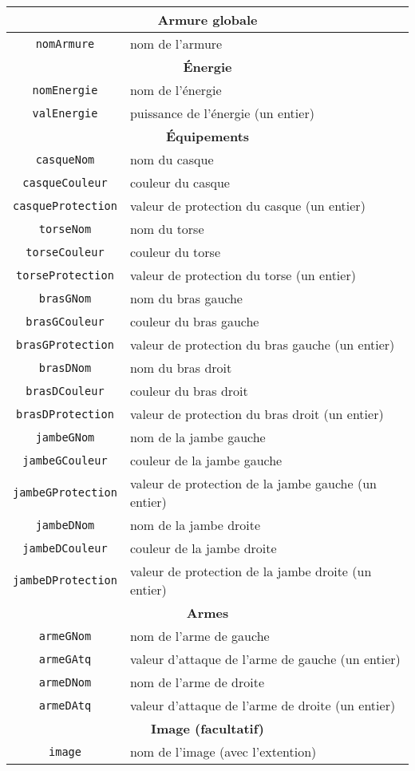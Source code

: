 \begin{center} 
	\begin{tabular}{|c|l|} 
		\hline
		\multicolumn{2}{|c|}{\textbf{Armure globale}} \\
		\hline
		\texttt{nomArmure} & nom de l'armure \\
		\hline
		\multicolumn{2}{|c|}{\textbf{\'Energie}} \\
		\hline
		\texttt{nomEnergie} & nom de l'énergie \\
		\texttt{valEnergie} & puissance de l'énergie (un entier) \\
		\hline
		\multicolumn{2}{|c|}{\textbf{\'Equipements}} \\
		\hline
		\texttt{casqueNom} & nom du casque \\
		\texttt{casqueCouleur} & couleur du casque \\
		\texttt{casqueProtection} & valeur de protection du casque (un entier) \\
		\texttt{torseNom} & nom du torse \\
		\texttt{torseCouleur} & couleur du torse \\
		\texttt{torseProtection} & valeur de protection du torse (un entier) \\
		\texttt{brasGNom} & nom du bras gauche \\
		\texttt{brasGCouleur} & couleur du bras gauche \\
		\texttt{brasGProtection} & valeur de protection du bras gauche (un entier) \\
		\texttt{brasDNom} & nom du bras droit \\
		\texttt{brasDCouleur} & couleur du bras droit \\
		\texttt{brasDProtection} & valeur de protection du bras droit (un entier) \\
		\texttt{jambeGNom} & nom de la jambe gauche \\
		\texttt{jambeGCouleur} & couleur de la jambe gauche \\
		\texttt{jambeGProtection} & valeur de protection de la jambe gauche (un entier) \\
		\texttt{jambeDNom} & nom de la jambe droite \\
		\texttt{jambeDCouleur} & couleur de la jambe droite \\
		\texttt{jambeDProtection} & valeur de protection de la jambe droite (un entier) \\
		\hline
		\multicolumn{2}{|c|}{\textbf{Armes}} \\
		\hline
		\texttt{armeGNom} & nom de l'arme de gauche \\
		\texttt{armeGAtq} & valeur d'attaque de l'arme de gauche (un entier) \\
		\texttt{armeDNom} & nom de l'arme de droite \\
		\texttt{armeDAtq} & valeur d'attaque de l'arme de droite (un entier) \\
		\hline
		\multicolumn{2}{|c|}{\textbf{Image (facultatif)}} \\
		\hline
		\texttt{image} & nom de l'image (avec l'extention) \\
		\hline
	\end{tabular}
\end{center}

